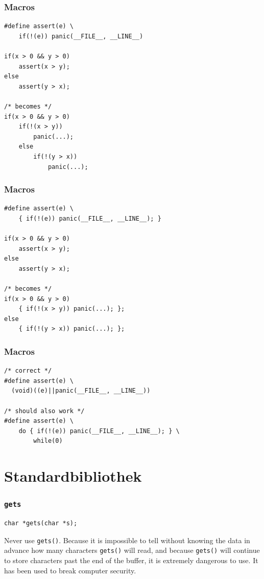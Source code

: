 \documentclass[12pt,compress]{beamer}
\begin{document}
\begin{frame}[fragile]
\frametitle{Macros}

\begin{lstlisting}
#define assert(e) \
	if(!(e)) panic(__FILE__, __LINE__)

if(x > 0 && y > 0)
    assert(x > y);
else
    assert(y > x);

/* becomes */
if(x > 0 && y > 0)
    if(!(x > y))
        panic(...);
    else
        if(!(y > x))
            panic(...);
\end{lstlisting}
\end{frame}


\begin{frame}[fragile]
\frametitle{Macros}

\begin{lstlisting}
#define assert(e) \
	{ if(!(e)) panic(__FILE__, __LINE__); }

if(x > 0 && y > 0)
    assert(x > y);
else
    assert(y > x);

/* becomes */
if(x > 0 && y > 0)
    { if(!(x > y)) panic(...); };
else
    { if(!(y > x)) panic(...); };
\end{lstlisting}
\end{frame}


\begin{frame}[fragile]
\frametitle{Macros}

\begin{lstlisting}
/* correct */
#define assert(e) \
  (void)((e)||panic(__FILE__, __LINE__))

/* should also work */
#define assert(e) \
	do { if(!(e)) panic(__FILE__, __LINE__); } \
		while(0)
\end{lstlisting}
\end{frame}

\section{Standardbibliothek}

\frame {
    \begin{center}
    \color{purple}
    \Huge Standardbibliothek
    \end{center}
}

\begin{frame}[fragile]
\frametitle{\texttt{gets}}

\begin{lstlisting}
char *gets(char *s);
\end{lstlisting}

\vfill

Never use \texttt{gets()}.  Because it is impossible to tell without knowing
the data in advance how many characters \texttt{gets()} will read, and because
\texttt{gets()} will continue to store characters past the end of the buffer,
it is extremely dangerous to use.  It has been used to break computer security.
\end{frame}
\end{document}
